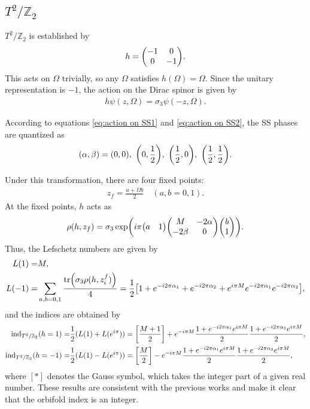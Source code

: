 \documentclass[11pt]{article}
\newcommand{\Lef}{Lefschetz }
\begin{document}
\subsection{ $T^2/ \mathbb{Z}_2$}
\label{subsec:T2Z2}

$T^2/\mathbb{Z}_2$ is established by
\begin{align}
    h=\mqty(-1 & 0 \\ 0& -1).
\end{align}
This acts on $\Omega$ trivially, so any $\Omega$ satisfies $h(\Omega)=\Omega$. Since the unitary representation is $-1$, the action on the Dirac spinor is given by
\begin{align}
    h\psi(z,\Omega)= \sigma_3 \psi(-z,\Omega).
\end{align}


According to equations \eqref{eq:action on SS1} and \eqref{eq:action on SS2}, the SS phases are quantized as \cite{Abe:2013bca} %
\begin{align}
     (\alpha ,\beta )=(0,0),~\qty(0,\frac{1}{2}),~\qty(\frac{1}{2},0),~\qty(\frac{1}{2},\frac{1}{2}). 
\end{align}

Under this transformation, there are four fixed points:
\begin{align}
    z_f=\frac{a +\Omega b}{2} \quad (a,b=0,1).
\end{align}
At the fixed points, $h$ acts as
\begin{align}
    \rho(h, z_f)= \sigma_3 \exp( i \pi \mqty(a & 1) \mqty( M & -2 \alpha \\ -2 \beta & 0 ) \mqty(b \\ 1)).
\end{align}
Thus, the \Lef numbers are given by
\begin{align} 
L(1)=& M, \\
    L(-1)= &\sum_{a,b=0,1}\frac{ \tr(\sigma_3 \rho(h, z_i^f)) }{4}
    =\frac{1}{2}\qty[1+ e^{-i2\pi\alpha_1} +e^{-i2\pi\alpha_2}+e^{i\pi M }e^{-i2\pi\alpha_1}e^{-i2\pi\alpha_2}],
\end{align}
and the indices are obtained by
\begin{align}
\text{ind}_{T^2/{\mathbb{Z}_2}}(h=1 )=& \frac{1}{2}(L(1)+L(e^{i\pi})) = \qty[\frac{M+1}{2}] + e^{-i\pi M} \frac{1+ e^{-i2\pi\alpha_1} e^{i\pi M} }{2}\frac{1+ e^{-i2\pi\alpha_2} e^{i\pi M} }{2}, \\
\text{ind}_{T^2/{\mathbb{Z}_2}}(h=-1 )=& \frac{1}{2}(L(1)-L(e^{i\pi})) = \qty[\frac{M}{2}] - e^{-i\pi M} \frac{1+ e^{-i2\pi\alpha_1} e^{i\pi M} }{2}\frac{1+ e^{-i2\pi\alpha_2} e^{i\pi M} }{2},
\end{align}
where $[\ast]$ denotes the Gauss symbol, which takes the integer part of a given real number. These results are consistent with the previous works \cite{Sakamoto:2020pev,Kobayashi:2022tti,Imai:2022bke} and make it clear that the orbifold index is an integer.
\end{document}
